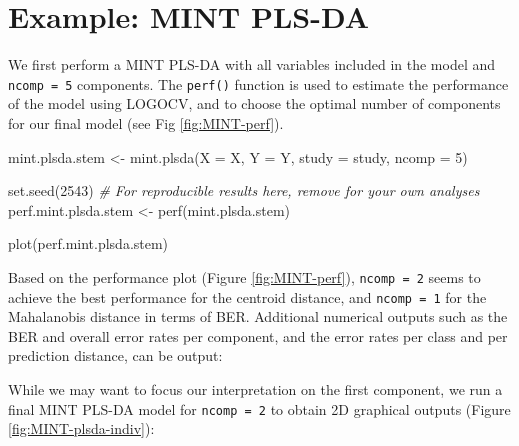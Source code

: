 \documentclass[
]{book}
\newenvironment{Shaded}{\begin{snugshade}}{\end{snugshade}}
\newcommand{\AttributeTok}[1]{\textcolor[rgb]{0.77,0.63,0.00}{#1}}
\newcommand{\CommentTok}[1]{\textcolor[rgb]{0.56,0.35,0.01}{\textit{#1}}}
\newcommand{\DecValTok}[1]{\textcolor[rgb]{0.00,0.00,0.81}{#1}}
\newcommand{\FunctionTok}[1]{\textcolor[rgb]{0.00,0.00,0.00}{#1}}
\newcommand{\NormalTok}[1]{#1}
\newcommand{\OtherTok}[1]{\textcolor[rgb]{0.56,0.35,0.01}{#1}}
\newcommand{\SpecialCharTok}[1]{\textcolor[rgb]{0.00,0.00,0.00}{#1}}
\begin{document}
\hypertarget{mint:plsda}{%
\section{Example: MINT PLS-DA}\label{mint:plsda}}

We first perform a MINT PLS-DA with all variables included in the model and \texttt{ncomp\ =\ 5} components. The \texttt{perf()} function is used to estimate the performance of the model using LOGOCV, and to choose the optimal number of components for our final model (see Fig \ref{fig:MINT-perf}).

\begin{Shaded}
\begin{Highlighting}[]
\NormalTok{mint.plsda.stem }\OtherTok{\textless{}{-}} \FunctionTok{mint.plsda}\NormalTok{(}\AttributeTok{X =}\NormalTok{ X, }\AttributeTok{Y =}\NormalTok{ Y, }\AttributeTok{study =}\NormalTok{ study, }\AttributeTok{ncomp =} \DecValTok{5}\NormalTok{)}

\FunctionTok{set.seed}\NormalTok{(}\DecValTok{2543}\NormalTok{) }\CommentTok{\# For reproducible results here, remove for your own analyses}
\NormalTok{perf.mint.plsda.stem }\OtherTok{\textless{}{-}} \FunctionTok{perf}\NormalTok{(mint.plsda.stem) }

\FunctionTok{plot}\NormalTok{(perf.mint.plsda.stem)}
\end{Highlighting}
\end{Shaded}



Based on the performance plot (Figure \ref{fig:MINT-perf}), \texttt{ncomp\ =\ 2} seems to achieve the best performance for the centroid distance, and \texttt{ncomp\ =\ 1} for the Mahalanobis distance in terms of BER. Additional numerical outputs such as the BER and overall error rates per component, and the error rates per class and per prediction distance, can be output:

\begin{Shaded}
\end{Shaded}

While we may want to focus our interpretation on the first component, we run a final MINT PLS-DA model for \texttt{ncomp\ =\ 2} to obtain 2D graphical outputs (Figure \ref{fig:MINT-plsda-indiv}):
\end{document}
